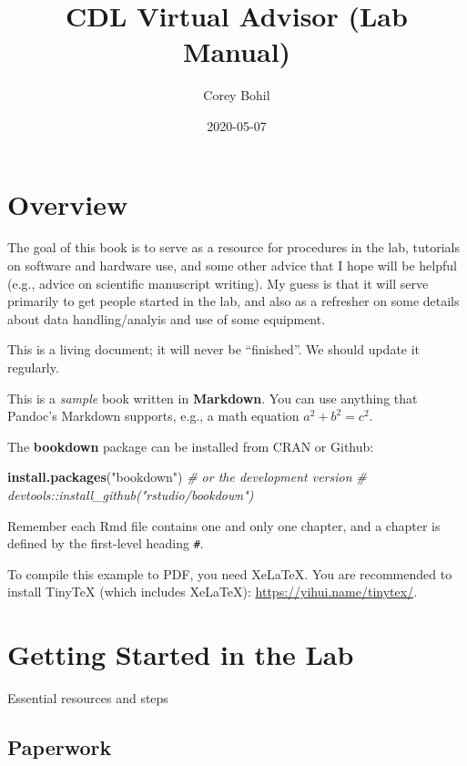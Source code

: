 \documentclass[
]{book}
\title{CDL Virtual Advisor (Lab Manual)}
\author{Corey Bohil}
\date{2020-05-07}
\newenvironment{Shaded}{\begin{snugshade}}{\end{snugshade}}
\newcommand{\CommentTok}[1]{\textcolor[rgb]{0.56,0.35,0.01}{\textit{#1}}}
\newcommand{\KeywordTok}[1]{\textcolor[rgb]{0.13,0.29,0.53}{\textbf{#1}}}
\newcommand{\NormalTok}[1]{#1}
\newcommand{\StringTok}[1]{\textcolor[rgb]{0.31,0.60,0.02}{#1}}
\begin{document}
\maketitle

{
\setcounter{tocdepth}{1}
\tableofcontents
}
\hypertarget{overview}{%
\chapter{Overview}\label{overview}}

The goal of this book is to serve as a resource for procedures in the lab, tutorials on software and hardware use, and some other advice that I hope will be helpful (e.g., advice on scientific manuscript writing). My guess is that it will serve primarily to get people started in the lab, and also as a refresher on some details about data handling/analyis and use of some equipment.

This is a living document; it will never be ``finished''. We should update it regularly.

This is a \emph{sample} book written in \textbf{Markdown}. You can use anything that Pandoc's Markdown supports, e.g., a math equation \(a^2 + b^2 = c^2\).

The \textbf{bookdown} package can be installed from CRAN or Github:

\begin{Shaded}
\begin{Highlighting}[]
\KeywordTok{install.packages}\NormalTok{(}\StringTok{"bookdown"}\NormalTok{)}
\CommentTok{# or the development version}
\CommentTok{# devtools::install_github("rstudio/bookdown")}
\end{Highlighting}
\end{Shaded}

Remember each Rmd file contains one and only one chapter, and a chapter is defined by the first-level heading \texttt{\#}.

To compile this example to PDF, you need XeLaTeX. You are recommended to install TinyTeX (which includes XeLaTeX): \url{https://yihui.name/tinytex/}.

\hypertarget{getting_started}{%
\chapter{Getting Started in the Lab}\label{getting_started}}

Essential resources and steps

\hypertarget{paperwork}{%
\section{Paperwork}\label{paperwork}}
\end{document}
